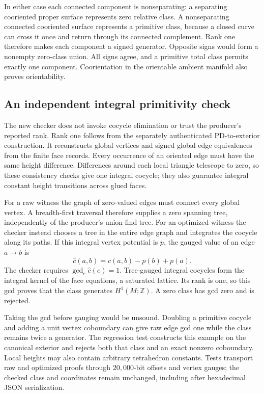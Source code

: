In either case each connected component is nonseparating: a separating
cooriented proper surface represents zero relative class. A nonseparating
connected cooriented surface represents a primitive class, because a
closed curve can cross it once and return through its connected complement.
Rank one therefore makes each component a signed generator. Opposite
signs would form a nonempty zero-class union. All signs agree, and a
primitive total class permits exactly one component. Coorientation in
the orientable ambient manifold also proves orientability.

\subsection{An independent integral primitivity check}

The new checker does not invoke cocycle elimination or trust the producer's
reported rank. Rank one follows from the separately authenticated
PD-to-exterior construction. It reconstructs global vertices and signed
global edge equivalences from the finite face records. Every occurrence
of an oriented edge must have the same height difference. Differences
around each local triangle telescope to zero, so these consistency checks
give one integral cocycle; they also guarantee integral constant height
transitions across glued faces.

For a raw witness the graph of zero-valued edges must connect every global
vertex. A breadth-first traversal therefore supplies a zero spanning tree,
independently of the producer's union-find tree. For an optimized witness
the checker instead chooses a tree in the entire edge graph and integrates
the cocycle along its paths. If this integral vertex potential is $p$, the
gauged value of an edge $a\to b$ is
\[
 \widehat c(a,b)=c(a,b)-p(b)+p(a).
\]
The checker requires $\gcd_e\widehat c(e)=1$. Tree-gauged integral
cocycles form the integral kernel of the face equations, a saturated
lattice. Its rank is one, so this gcd proves that the class generates
$H^1(M;\mathbb Z)$. A zero class has gcd zero and is rejected.

Taking the gcd before gauging would be unsound. Doubling a primitive
cocycle and adding a unit vertex coboundary can give raw edge gcd one
while the class remains twice a generator. The regression test constructs
this example on the canonical exterior and rejects both that class and
an exact nonzero coboundary. Local heights may also contain arbitrary
tetrahedron constants. Tests transport raw and optimized proofs through
$20{,}000$-bit offsets and vertex gauges; the checked class and coordinates
remain unchanged, including after hexadecimal JSON serialization.

